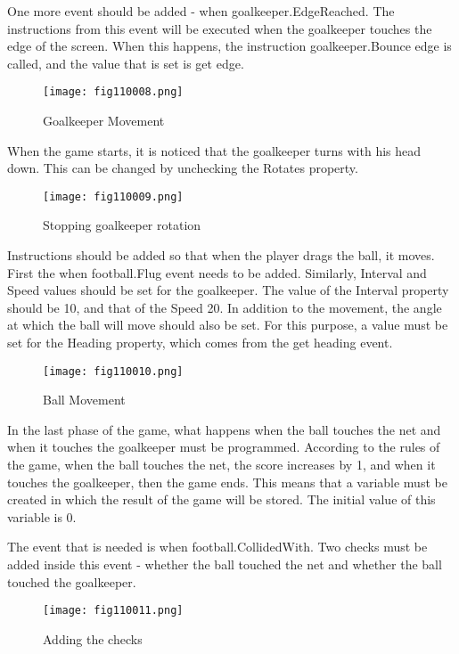 One more event should be added - when goalkeeper.EdgeReached. The instructions from this event will be executed when the goalkeeper touches the edge of the screen. When this happens, the instruction goalkeeper.Bounce edge is called, and the value that is set is get edge.

\begin{figure}[H]
   \centering
   \texttt{[image: fig110008.png]}
   \caption{Goalkeeper Movement}
\label{fig110008}
\end{figure}

When the game starts, it is noticed that the goalkeeper turns with his head down. This can be changed by unchecking the Rotates property.

\begin{figure}[H]
   \centering
   \texttt{[image: fig110009.png]}
   \caption{Stopping goalkeeper rotation}
\label{fig110009}
\end{figure}

Instructions should be added so that when the player drags the ball, it moves. First the when football.Flug event needs to be added. Similarly, Interval and Speed values should be set for the goalkeeper. The value of the Interval property should be 10, and that of the Speed 20. In addition to the movement, the angle at which the ball will move should also be set. For this purpose, a value must be set for the Heading property, which comes from the get heading event.

\begin{figure}[H]
   \centering
   \texttt{[image: fig110010.png]}
   \caption{Ball Movement}
\label{fig110010}
\end{figure}

In the last phase of the game, what happens when the ball touches the net and when it touches the goalkeeper must be programmed. According to the rules of the game, when the ball touches the net, the score increases by 1, and when it touches the goalkeeper, then the game ends. This means that a variable must be created in which the result of the game will be stored. The initial value of this variable is 0.

The event that is needed is when football.CollidedWith. Two checks must be added inside this event - whether the ball touched the net and whether the ball touched the goalkeeper.

\begin{figure}[H]
   \centering
   \texttt{[image: fig110011.png]}
   \caption{Adding the checks}
\label{fig110011}
\end{figure}


